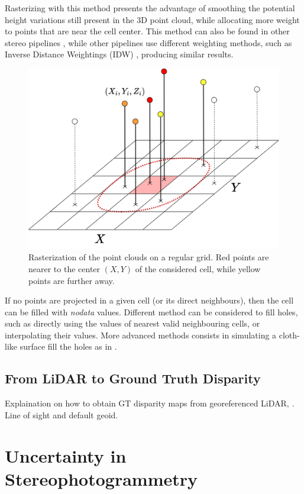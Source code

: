 Rasterizing with this method presents the advantage of smoothing the potential height variations still present in the 3D point cloud, while allocating more weight to points that are near the cell center. This method can also be found in other stereo pipelines \cite{shean_automated_2016}, while other pipelines use different weighting methods, such as Inverse Distance Weightings (IDW) \cite{rupnik_micmac_2017}, producing similar results.

\begin{figure}
    \centering
    \includegraphics[width=0.7\linewidth]{Images/Chap_1/Rasterization.png}
    \caption{Rasterization of the point clouds on a regular grid. Red points are nearer to the center $(X,Y)$ of the considered cell, while yellow points are further away.}
    \label{fig:rasterization}
\end{figure}

\begin{remark}
    If no points are projected in a given cell (or its direct neighbours), then the cell can be filled with \textit{nodata} values. Different method can be considered to fill holes, such as directly using the values of nearest valid neighbouring cells, or interpolating their values. More advanced methods consists in simulating a cloth-like surface fill the holes as in \cite{lallement_bulldozer_2022}.
\end{remark}

\subsection{From LiDAR to Ground Truth Disparity}
Explaination on how to obtain GT disparity maps from georeferenced LiDAR, \cite{cournet_ground_2020}. Line of sight and default geoid. 

\section{Uncertainty in Stereophotogrammetry}\label{sec:previous_work_stereo_uncertainty}
